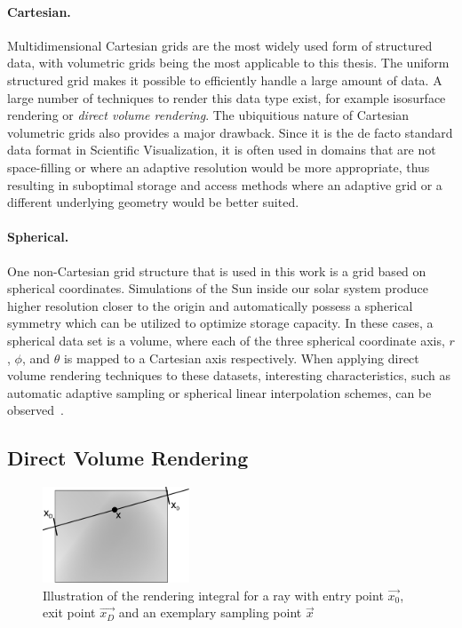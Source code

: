 \paragraph{Cartesian. }  Multidimensional Cartesian grids are the most widely used form of structured data, with  volumetric grids being the most applicable to this thesis.  The uniform structured grid makes it possible to efficiently handle a large amount of data.  A large number of techniques to render this data type exist, for example isosurface rendering or \emph{direct volume rendering}.  The ubiquitious nature of Cartesian volumetric grids also provides a major drawback.  Since it is the de facto standard data format in Scientific Visualization, it is often used in domains that are not space-filling or where an adaptive resolution would be more appropriate, thus resulting in suboptimal storage and access methods where an adaptive grid or a different underlying geometry would be better suited.

\paragraph{Spherical. }  One non-Cartesian grid structure that is used in this work is a grid based on spherical coordinates.  Simulations of the Sun inside our solar system produce higher resolution closer to the origin and automatically possess a spherical symmetry which can be utilized to optimize storage capacity.  In these cases, a spherical data set is a  volume, where each of the three spherical coordinate axis, $r$, $\phi$, and $\theta$ is mapped to a Cartesian axis respectively.  When applying direct volume rendering techniques to these datasets, interesting characteristics, such as automatic adaptive sampling or spherical linear interpolation schemes, can be observed~\cite{balabanian2007sonar}.

\subsection{Direct Volume Rendering} \label{cha:intro:vp:dvr}

\begin{figure}
\centering
\includegraphics[width=0.39\textwidth]{figures/intro/rendering_integral.pdf}
\caption{Illustration of the rendering integral for a ray with entry point $\vec{x_0}$, exit point $\vec{x_D}$ and an exemplary sampling point $\vec{x}$}
\label{fig:intro:dvr}
\end{figure}

